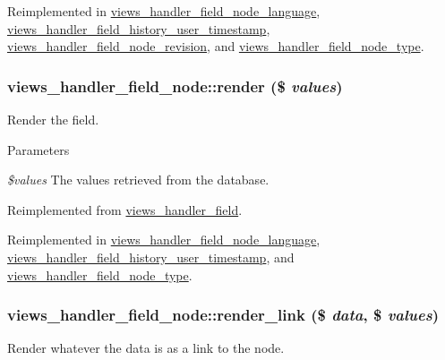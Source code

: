 Reimplemented in \hyperlink{classviews__handler__field__node__language_a5b37f58031ab251591bc4aad0651e8b4}{views\_\-handler\_\-field\_\-node\_\-language}, \hyperlink{classviews__handler__field__history__user__timestamp_a785f6784b015c681b25f58573b1e6859}{views\_\-handler\_\-field\_\-history\_\-user\_\-timestamp}, \hyperlink{classviews__handler__field__node__revision_a81c730d40af84b9309664ae8c7992429}{views\_\-handler\_\-field\_\-node\_\-revision}, and \hyperlink{classviews__handler__field__node__type_a0152124a453b32265e512bace19d6de4}{views\_\-handler\_\-field\_\-node\_\-type}.\hypertarget{classviews__handler__field__node_afe7681e1188ad74ce9b604ad3ba864c0}{
\subsubsection[{render}]{\setlength{\rightskip}{0pt plus 5cm}views\_\-handler\_\-field\_\-node::render (\$ {\em values})}}
\label{classviews__handler__field__node_afe7681e1188ad74ce9b604ad3ba864c0}
Render the field.


\begin{DoxyParams}{Parameters}
\item[{\em \$values}]The values retrieved from the database. \end{DoxyParams}


Reimplemented from \hyperlink{classviews__handler__field_a82ff951c5e9ceb97b2eab86f880cbc1e}{views\_\-handler\_\-field}.

Reimplemented in \hyperlink{classviews__handler__field__node__language_a04be837ecac8fcbbb38fb1a17e45263a}{views\_\-handler\_\-field\_\-node\_\-language}, \hyperlink{classviews__handler__field__history__user__timestamp_acc2398dad2662ab9d4faf0ea9daba116}{views\_\-handler\_\-field\_\-history\_\-user\_\-timestamp}, and \hyperlink{classviews__handler__field__node__type_a13c9a516cca49870a1603fdd26071851}{views\_\-handler\_\-field\_\-node\_\-type}.\hypertarget{classviews__handler__field__node_a0ea7eeac3500e011ae0a83e67f56508d}{
\subsubsection[{render\_\-link}]{\setlength{\rightskip}{0pt plus 5cm}views\_\-handler\_\-field\_\-node::render\_\-link (\$ {\em data}, \/  \$ {\em values})}}
\label{classviews__handler__field__node_a0ea7eeac3500e011ae0a83e67f56508d}
Render whatever the data is as a link to the node.

